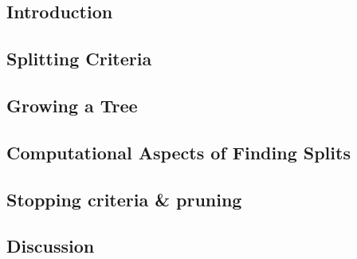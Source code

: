 

\subsection{Introduction}


\subsection{Splitting Criteria}


\subsection{Growing a Tree}


\subsection{Computational Aspects of Finding Splits}


\subsection{Stopping criteria \& pruning}


\subsection{Discussion}

